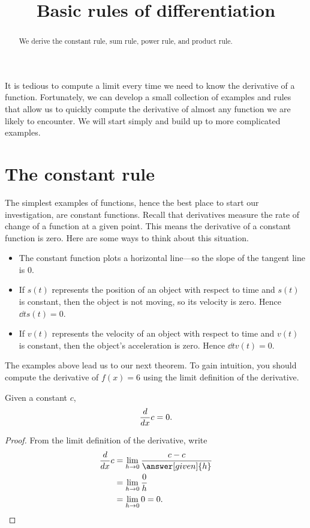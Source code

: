 \documentclass{ximera}
\title[Dig-In:]{Basic rules of differentiation}
\begin{document}
\begin{abstract}
  We derive the constant rule, sum rule, power rule, and product rule. 
\end{abstract}
\maketitle

It is tedious to compute a limit every time we need to know the
derivative of a function.  Fortunately, we can develop a small
collection of examples and rules that allow us to quickly compute the
derivative of almost any function we are likely to encounter.  We will
start simply and build up to more complicated examples.


\section{The constant rule}

The simplest examples of functions, hence the best place to start our
investigation, are constant functions.  Recall that derivatives
measure the rate of change of a function at a given point. This means the
derivative of a constant function is zero. Here are some ways to think about
this situation.
\begin{itemize}
\item The constant function plots a horizontal line---so the slope of
  the tangent line is $0$.
\item If $s(t)$ represents the position of an object with respect to
  time and $s(t)$ is constant, then the object is not moving, so its
  velocity is zero. Hence $\dd{t} s(t) = 0$.
\item If $v(t)$ represents the velocity of an object with respect to
  time and $v(t)$ is constant, then the object's acceleration is
  zero. Hence $\dd{t} v(t) = 0$.
\end{itemize}
The examples above lead us to our next theorem.
To gain intuition, you should compute the derivative of
  $f(x) = 6$ using the limit definition of the derivative.

\begin{theorem}
Given a constant $c$,
\[
\frac{d}{dx} c = 0.
\]

\begin{proof}
From the limit definition of the derivative, write
\begin{align*}
\ddx c &= \lim_{h\to 0}\frac{c-c}{\answer[given]{h}}\\
&= \lim_{h\to 0} \frac{0}{h}\\
&= \lim_{h\to 0} 0 = 0.
\end{align*}
\end{proof}
\end{theorem}
\end{document}
